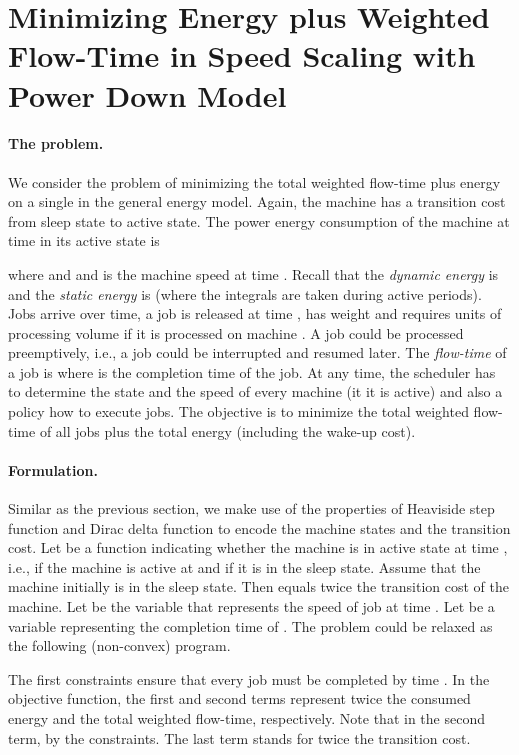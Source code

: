 \documentclass[11pt]{article}
\begin{document}
\section{Minimizing Energy plus Weighted Flow-Time in Speed Scaling with 
Power Down Model}		\label{sec:4S-energy+flow}

\paragraph{The problem.} 


We consider the problem of minimizing the total weighted flow-time
plus energy on a single in the general energy model. 
Again, the machine has a transition cost  from sleep state to active state.
The power energy consumption of the machine at time  in its active state is 

where  and  and  is the machine speed at time . 
Recall that the \emph{dynamic energy} is 
 and the \emph{static energy} is
 (where the integrals are taken during
active periods).
Jobs arrive over time, a job  is released at time , has weight  
and requires  units of processing volume if it is processed 
on machine . A job could be processed preemptively, i.e., a job could be interrupted and resumed later. 
The \emph{flow-time} of a job  is  where
 is the completion time of the job.
At any time, the scheduler has to determine the state and the speed of every machine (it it is active) 
and also a policy how to execute jobs.
The objective is to minimize the total weighted flow-time of all jobs plus the total 
energy (including the wake-up cost). 

\paragraph{Formulation.} Similar as the previous section, we 
make use of the properties of Heaviside step function and Dirac delta function to encode 
the machine states and the transition cost. Let  be a function
indicating whether the machine  is in active state at time , i.e.,  if 
the machine is active at  and  if it is in the sleep state. 
Assume that the machine initially is in the sleep state. Then
 equals twice the transition cost
of the machine.
Let  be the variable that represents 
the speed of job  at time . Let  be 
a variable representing the completion time of . 
The problem could be relaxed as the following (non-convex) program.

  
The first constraints ensure that every job  must 
be completed by time . 
In the objective function, the first and second terms represent
twice the consumed energy and the total weighted flow-time, respectively. 
Note that in the second term,  by the constraints. 
The last term stands for twice the transition cost. 
\end{document}
